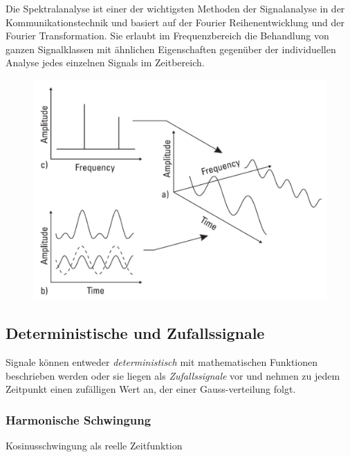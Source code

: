 \documentclass[
  10pt,
  a4paper,
  german]{article}
\numberwithin{equation}{section}
\begin{document}
Die Spektralanalyse ist einer der wichtigsten Methoden der Signalanalyse
in der Kommunikationstechnik und basiert auf der Fourier
Reihenentwicklung und der Fourier Transformation. Sie erlaubt im
Frequenzbereich die Behandlung von ganzen Signalklassen mit ähnlichen
Eigenschaften gegenüber der individuellen Analyse jedes einzelnen
Signals im Zeitbereich.

\begin{figure}[H]

{\centering \includegraphics{images/02_Signalanalyse.png}

}

\end{figure}

\hypertarget{deterministische-und-zufallssignale}{%
\subsection{Deterministische und
Zufallssignale}\label{deterministische-und-zufallssignale}}

Signale können entweder \emph{deterministisch} mit mathematischen
Funktionen beschrieben werden oder sie liegen als \emph{Zufallssignale}
vor und nehmen zu jedem Zeitpunkt einen zufälligen Wert an, der einer
Gauss-verteilung folgt.

\hypertarget{harmonische-schwingung}{%
\subsubsection{Harmonische Schwingung}\label{harmonische-schwingung}}

Kosinusschwingung als reelle Zeitfunktion
\end{document}
